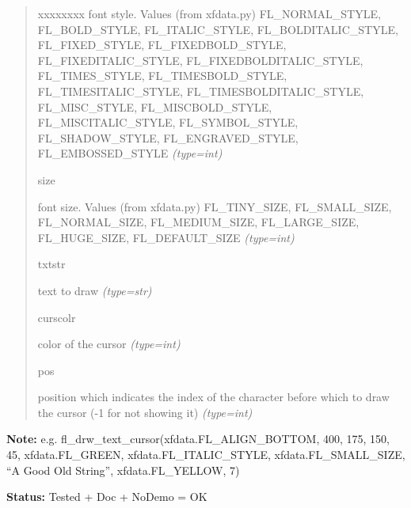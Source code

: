 \begin{boxedminipage}{\funcwidth}
\begin{quote}
\begin{Ventry}{xxxxxxxx}
font style. Values (from xfdata.py) FL\_NORMAL\_STYLE, FL\_BOLD\_STYLE,
FL\_ITALIC\_STYLE, FL\_BOLDITALIC\_STYLE, FL\_FIXED\_STYLE,
FL\_FIXEDBOLD\_STYLE, FL\_FIXEDITALIC\_STYLE, FL\_FIXEDBOLDITALIC\_STYLE,
FL\_TIMES\_STYLE, FL\_TIMESBOLD\_STYLE, FL\_TIMESITALIC\_STYLE,
FL\_TIMESBOLDITALIC\_STYLE, FL\_MISC\_STYLE, FL\_MISCBOLD\_STYLE,
FL\_MISCITALIC\_STYLE, FL\_SYMBOL\_STYLE, FL\_SHADOW\_STYLE,
FL\_ENGRAVED\_STYLE, FL\_EMBOSSED\_STYLE
            {\it (type=int)}

          \item[size]


font size. Values (from xfdata.py) FL\_TINY\_SIZE, FL\_SMALL\_SIZE,
FL\_NORMAL\_SIZE, FL\_MEDIUM\_SIZE, FL\_LARGE\_SIZE, FL\_HUGE\_SIZE,
FL\_DEFAULT\_SIZE
            {\it (type=int)}

          \item[txtstr]


text to draw
            {\it (type=str)}

          \item[curscolr]


color of the cursor
            {\it (type=int)}

          \item[pos]


position which indicates the index of the character before which to
draw the cursor (-1 for not showing it)
            {\it (type=int)}

        \end{Ventry}

      \end{quote}

\textbf{Note:} 
e.g. fl\_drw\_text\_cursor(xfdata.FL\_ALIGN\_BOTTOM, 400, 175, 150, 45,
xfdata.FL\_GREEN, xfdata.FL\_ITALIC\_STYLE, xfdata.FL\_SMALL\_SIZE,
``A Good Old String'', xfdata.FL\_YELLOW, 7)


\textbf{Status:} 
Tested + Doc + NoDemo = OK


    \end{boxedminipage}

    \label{xformslib:flbasic:fl_drw_box}

    \vspace{0.5ex}

